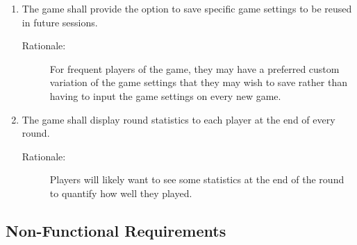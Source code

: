 \begin{enumerate}[label=R\arabic*, start=1, left=0pt]
    \item The game shall provide the option to save specific game settings to be reused in future sessions.
    \begin{description}
        \item[Rationale:] For frequent players of the game, they may have a preferred custom variation of the game settings that they may wish to save rather than having to input the game settings on every new game.
    \end{description}

    \item The game shall display round statistics to each player at the end of every round.
    \begin{description}
        \item[Rationale:] Players will likely want to see some statistics at the end of the round to quantify how well they played.
    \end{description}

\end{enumerate}

\subsection{Non-Functional Requirements}

